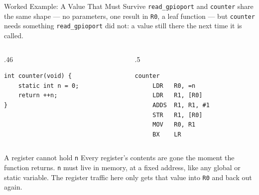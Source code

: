 \documentclass[9pt,aspectratio=169,xcolor=table]{beamer}
\begin{document}
\begin{frame}[fragile]{Worked Example: A Value That Must Survive}
    \leavevmode
    {\small \texttt{read\_gpioport} and \texttt{counter} share the same shape
    --- no parameters, one result in \texttt{R0}, a leaf function --- but
    \texttt{counter} needs something \texttt{read\_gpioport} did not: a value
    still there the \alert{next} time it is called.}

    \vspace{2mm}
    \begin{columns}[T]
    \begin{column}{.46\textwidth}
        \begin{lstlisting}[style=myc, basicstyle=\normalsize\ttfamily]
int counter(void) {
    static int n = 0;
    return ++n;
}
        \end{lstlisting}
    \end{column}
    \begin{column}{.5\textwidth}
        \begin{lstlisting}[style=armasm, language=ARM, basicstyle=\normalsize\ttfamily]
counter
     LDR   R0, =n
     LDR   R1, [R0]
     ADDS  R1, R1, #1
     STR   R1, [R0]
     MOV   R0, R1
     BX    LR
        \end{lstlisting}
    \end{column}
    \end{columns}

    \vspace{3mm}
\begin{block}{A register cannot hold \texttt{n}} Every register's contents are gone the moment the function returns. \texttt{n} must live in \alert{memory}, at a fixed address, like any global or static variable. The register traffic here only gets that value into \texttt{R0} and back out again. \end{block}
\end{frame}
\end{document}
